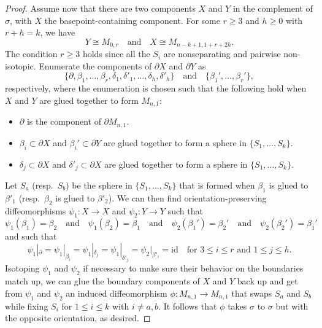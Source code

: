 \documentclass[11pt]{amsart}
\numberwithin{equation}{section}
\theoremstyle{plain}
\theoremstyle{definition}
\theoremstyle{remark}
\begin{document}
\begin{proof}
Assume now that there are two components $X$ and $Y$ in the complement of $\sigma$,
with $X$ the basepoint-containing component.  For some $r \geq 3$ and $h \geq 0$
with $r+h = k$, we have
\[Y \cong M_{0,r} \quad \text{and} \quad X \cong M_{n-k+1,1+r+2h}.\]
The condition $r \geq 3$ holds since all the $S_i$ are nonseparating and pairwise non-isotopic.  Enumerate
the components of $\partial X$ and $\partial Y$ as
\[\{\partial,\beta_1,\ldots,\beta_{r},\delta_1,\delta'_1,\ldots,\delta_{h},\delta'_{h}\}
\quad \text{and} \quad \{\beta_1',\ldots,\beta_{r}'\},\]
respectively, where the enumeration is chosen such that the following hold when $X$
and $Y$ are glued together to form $M_{n,1}$:
\begin{itemize}
\item $\partial$ is the component of $\partial M_{n,1}$.
\item $\beta_i \subset \partial X$ and $\beta_i' \subset \partial Y$ are glued together 
to form a sphere in $\{S_1,\ldots,S_k\}$.
\item $\delta_j \subset \partial X$ and $\delta'_j \subset \partial X$ are glued together
to form a sphere in $\{S_1,\ldots,S_k\}$.
\end{itemize}
Let $S_a$ (resp.\ $S_b$) be the sphere in $\{S_1,\ldots,S_k\}$ that is formed
when $\beta_1$ is glued to $\beta'_1$ (resp.\ $\beta_2$ is glued to $\beta'_2$).  
We can then find orientation-preserving diffeomorphisms $\psi_1\colon X \rightarrow X$
and $\psi_2\colon Y \rightarrow Y$ such that
\[\psi_1(\beta_1) = \beta_2 \quad \text{and} \quad \psi_1(\beta_2) = \beta_1 \quad \text{and} \quad 
\psi_2(\beta_1') = \beta_2' \quad \text{and} \quad \psi_2(\beta_2') = \beta_1'\]
and such that
\[\psi_1|_{\partial} = \psi_1|_{\beta_i} = \psi_1|_{\delta_j} = \psi_1|_{\delta'_j} = \psi_2|_{\beta'_i} = \text{id} \quad \text{for $3 \leq i \leq r$ and $1 \leq j \leq h$}.\]
Isotoping $\psi_1$ and $\psi_2$ if necessary to make sure their behavior on the boundaries match
up, we can glue the boundary components of $X$ and $Y$ back up and get from $\psi_1$ and
$\psi_2$ an induced diffeomorphism $\phi\colon M_{n,1} \rightarrow M_{n,1}$ that
swaps $S_a$ and $S_b$ while fixing $S_i$ for $1 \leq i \leq k$ with $i \neq a,b$.
It follows that $\phi$ takes $\sigma$ to $\sigma$ but with the opposite
orientation, as desired.
\end{proof}
\end{document}
